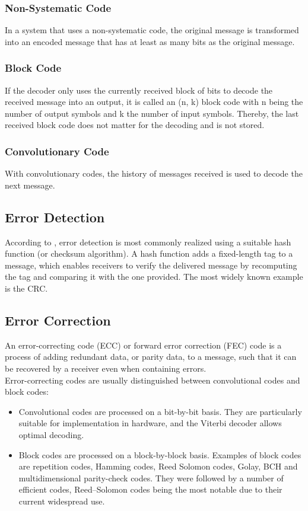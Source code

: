 \subsubsection{Non-Systematic Code}
In a system that uses a non-systematic code, the original message is transformed into an encoded message that has at least as many bits as the original message.
\subsubsection{Block Code}
If the decoder only uses the currently received block of bits to decode the received message into an output, it is called an (n, k) block code with n being the number of output symbols and k the number of input symbols. Thereby, the last received block code does not matter for the decoding and is not stored. 
\subsubsection{Convolutionary Code}
With convolutionary codes, the history of messages received is used to decode the next message.
%
%
%
\subsection{Error Detection}
According to \cite{ErrorDetectionAndCorrection_Wikipedia}, error detection is most commonly realized using a suitable hash function (or checksum algorithm). A hash function adds a fixed-length tag to a message, which enables receivers to verify the delivered message by recomputing the tag and comparing it with the one provided. The most widely known example is the CRC.
%
%
\subsection{Error Correction}
An error-correcting code (ECC) or forward error correction (FEC) code is a process of adding redundant data, or parity data, to a message, such that it can be recovered by a receiver even when containing errors.\\
Error-correcting codes are usually distinguished between convolutional codes and block codes:
\begin{itemize}
    \item Convolutional codes are processed on a bit-by-bit basis. They are particularly suitable for implementation in hardware, and the Viterbi decoder allows optimal decoding.
    \item Block codes are processed on a block-by-block basis. Examples of block codes are repetition codes, Hamming codes, Reed Solomon codes, Golay, BCH and multidimensional parity-check codes. They were followed by a number of efficient codes, Reed–Solomon codes being the most notable due to their current widespread use.
\end{itemize}
%
%
